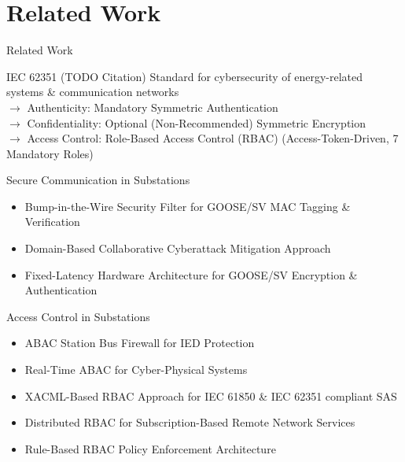 \documentclass[en]{sdqbeamer}
\begin{document}
\section{Related Work}
\begin{frame}[allowframebreaks]{Related Work}
    \begin{blueblock}{IEC 62351 (TODO Citation)}
        Standard for cybersecurity of energy-related systems \& communication networks
        \\$\rightarrow$ Authenticity: Mandatory Symmetric Authentication
        \\$\rightarrow$ Confidentiality: Optional (Non-Recommended) Symmetric Encryption
        \\$\rightarrow$ Access Control: Role-Based Access Control (RBAC) (Access-Token-Driven, 7 Mandatory Roles)
    \end{blueblock}
    \framebreak
    \begin{blueblock}{Secure Communication in Substations}
        \begin{itemize}
            \item Bump-in-the-Wire Security Filter for GOOSE/SV MAC Tagging \& Verification \parencite{Ishchenko2018}
            \item Domain-Based Collaborative Cyberattack Mitigation Approach \parencite{Hong2019}
            \item Fixed-Latency Hardware Architecture for GOOSE/SV Encryption \& Authentication \parencite{Rodriguez2021}
        \end{itemize}
    \end{blueblock}

    \begin{blueblock}{Access Control in Substations}
        \begin{itemize}
            \item ABAC Station Bus Firewall for IED Protection \parencite{Ruland2018}
            \item Real-Time ABAC for Cyber-Physical Systems \parencite{Burmester2013}
            \item XACML-Based RBAC Approach for IEC 61850 \& IEC 62351 compliant SAS \parencite{Lee2015}
            \item Distributed RBAC for Subscription-Based Remote Network Services \parencite{Ma2006} %
            \item Rule-Based RBAC Policy Enforcement Architecture \parencite{Alcaraz2016} %
        \end{itemize}
    \end{blueblock}
\end{frame}
\end{document}
